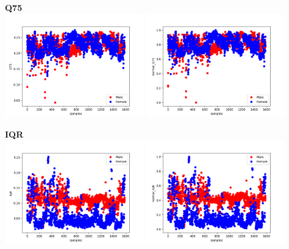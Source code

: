 \documentclass[12pt]{article}
\begin{document}
\begin{justify}
			\textbf{Q75}\\
				\includegraphics[width=6cm]{../Graphs2/Q75}
				\includegraphics[width=6cm]{../Graphs2/norm_Q75}	
			
			\textbf{IQR}\\
				\includegraphics[width=6cm]{../Graphs2/IQR}
				\includegraphics[width=6cm]{../Graphs2/norm_IQR}	
				

\end{justify}
\end{document}
